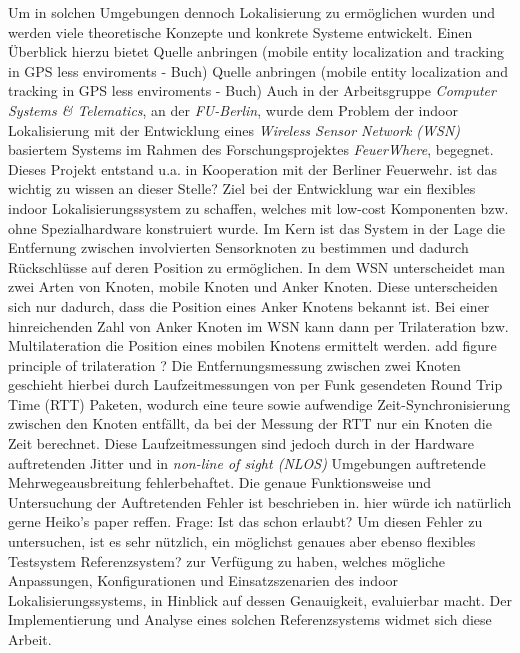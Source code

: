 Um in solchen Umgebungen dennoch Lokalisierung zu ermöglichen wurden und werden viele theoretische Konzepte und 
konkrete Systeme entwickelt. Einen Überblick hierzu bietet
{\color{red}Quelle anbringen (mobile entity localization and tracking in GPS less enviroments - Buch)}
Quelle anbringen (mobile entity localization and tracking in GPS less enviroments - Buch)
Auch in der Arbeitsgruppe \textit{Computer Systems \& Telematics}, an der \textit{FU-Berlin}, 
wurde dem Problem der indoor Lokalisierung mit der Entwicklung eines \textit{Wireless Sensor Network (WSN)}
basiertem Systems im Rahmen des Forschungsprojektes \textit{FeuerWhere}, begegnet. 
Dieses Projekt entstand u.a. in Kooperation mit der Berliner Feuerwehr.
{\color{red}ist das wichtig zu wissen an dieser Stelle?}
Ziel bei der Entwicklung war ein flexibles indoor Lokalisierungssystem zu schaffen, welches mit
low-cost Komponenten bzw. ohne Spezialhardware konstruiert wurde. 
Im Kern ist das System in der Lage die Entfernung zwischen involvierten Sensorknoten zu bestimmen und 
dadurch Rückschlüsse auf deren Position zu ermöglichen. 
In dem WSN unterscheidet man zwei Arten von Knoten, mobile Knoten und Anker Knoten. 
Diese unterscheiden sich nur dadurch, dass die Position eines Anker Knotens bekannt ist.
Bei einer hinreichenden Zahl von Anker Knoten im WSN kann dann per Trilateration bzw. Multilateration 
die Position eines mobilen Knotens ermittelt werden.
{\color{red} add figure principle of trilateration ?}
Die Entfernungsmessung zwischen zwei Knoten geschieht hierbei durch Laufzeitmessungen von per Funk gesendeten
Round Trip Time (RTT) Paketen, wodurch eine teure sowie aufwendige Zeit-Synchronisierung zwischen den Knoten entfällt,
da bei der Messung der RTT nur ein Knoten die Zeit berechnet.
Diese Laufzeitmessungen sind jedoch durch in der Hardware auftretenden Jitter und 
in \textit{non-line of sight (NLOS)} Umgebungen auftretende Mehrwegeausbreitung fehlerbehaftet. 
Die genaue Funktionsweise und Untersuchung der Auftretenden Fehler ist beschrieben in.
{\color{red} hier würde ich natürlich gerne Heiko's paper reffen. Frage: Ist das schon erlaubt?}
Um diesen Fehler zu untersuchen, ist es sehr nützlich, ein möglichst genaues aber ebenso flexibles Testsystem
{\color{red}Referenzsystem?} zur Verfügung zu haben, welches mögliche Anpassungen, Konfigurationen und 
Einsatzszenarien des indoor Lokalisierungssystems, in Hinblick auf dessen Genauigkeit, evaluierbar macht.
Der Implementierung und Analyse eines solchen Referenzsystems widmet sich diese Arbeit. 


